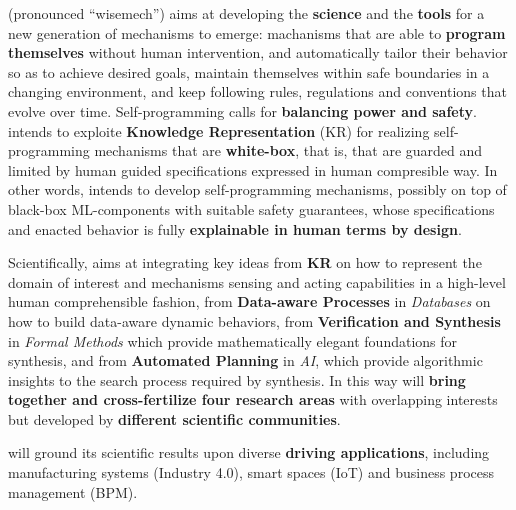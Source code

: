 \project (pronounced ``wisemech'') aims at developing the \textbf{science} and the \textbf{tools} for a new
generation of mechanisms to emerge: machanisms that are able to
\textbf{program themselves} without human intervention, and
automatically tailor their behavior so as to
achieve desired goals,  maintain themselves within safe boundaries in a
changing environment, and keep following rules,
regulations and conventions that evolve over time. 
Self-programming calls for \textbf{balancing power and safety}.
\project intends to exploite \textbf{Knowledge Representation} (KR)
for realizing self-programming mechanisms that are \textbf{white-box},
that is, that are guarded and limited by human guided
specifications expressed in human compresible way. In other words, \project intends to develop
self-programming mechanisms, possibly on top of black-box
ML-components with suitable safety guarantees, whose specifications
and enacted behavior is fully \textbf{explainable in human terms by
  design}.


Scientifically, \project aims at integrating key ideas
from \textbf{KR} on how to represent the domain of interest and 
mechanisms sensing and acting capabilities in a high-level human comprehensible
fashion,
from \textbf{Data-aware Processes} in \emph{Databases} on how to
build data-aware dynamic behaviors,
from \textbf{Verification and Synthesis} in \emph{Formal
  Methods} which provide mathematically elegant foundations for
synthesis,
and from \textbf{Automated Planning} in \emph{AI}, which provide
algorithmic insights to the search process required by synthesis.
%
In this way \project will \textbf{bring together and cross-fertilize
  four research areas} with overlapping interests but developed by
\textbf{different scientific communities}.

\project will ground its scientific results upon diverse
\textbf{driving applications}, including manufacturing systems
(Industry 4.0), smart spaces (IoT) and business process management
(BPM).

 


